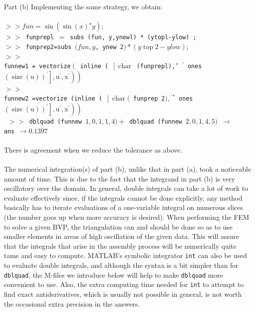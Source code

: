\documentclass[../main.tex]{subfiles}
\begin{document}
Part (b) Implementing the same strategy, we obtain: 
\\
\\
\texttt{$>>f u n=\sin \left(\sin (x)^{\star} y\right) ;$\\
$>>$ funprepl $=$ subs (fun, y,ynewl) * (ytopl-ylow) ;\\
$>>$ funprep2=subs $(f u n, y$, ynew 2$) *(y \operatorname{top} 2-y l o w) ;$\\
$>>$\\
funnew1 = vectorize$\left(\right.$ inline ( $\left[\operatorname{char}\right.$ (funprepl),' ${ }^{\prime}$ ones $\left.\left.\left.(\operatorname{size}(\mathrm{u}))^{\prime}\right], \mathrm{u}^{\prime}, \mathrm{x}^{\prime}\right)\right)$\\
$>>$\\
funnew2 =vectorize (inline ( $\left[\operatorname{char}(\right.$ funprep 2$),{ }^{\prime}{ }^{*}$ ones $\left.\left.\left.(\operatorname{size}(\mathrm{u}))^{\prime}\right], \mathrm{u}^{\prime}, \mathrm{x}^{\prime}\right)\right)$\\\
$>>$ dblquad (funnew $1,0,1,1,4)+$ dblquad (funnew $2,0,1,4,5)$
$\rightarrow$
\\ ans $\rightarrow 0.1397$}
\\
\\
There is agreement when we reduce the tolerance as above. 
\\
\\
The numerical integration(s) of part (b), unlike that in part (a), took a noticeable amount of time. This is due to the fact that the integrand in part (b) is very oscillatory over the domain. In general, double integrals can take a lot of work to evaluate effectively since, if the integrals cannot be done explicitly, any method basically has to iterate evaluations of a one-variable integral on numerous slices (the number goes up when more accuracy is desired). When performing the FEM to solve a given BVP, the triangulation can and should be done so as to use smaller elements in areas of high oscillation of the given data. This will assure that the integrals that arise in the assembly process will be numerically quite tame and easy to compute. MATLAB's symbolic integrator \texttt{int} can also be used to evaluate double integrals, and although the syntax is a bit simpler than for \texttt{dblquad}, the M-files we introduce below will help to make \texttt{dblquad} more convenient to use. Also, the extra computing time needed for \texttt{int} to attempt to find exact antiderivatives, which is usually not possible in general, is not worth the occasional extra precision in the answers.
\\
\end{document}
